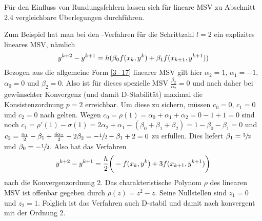 Für den Einfluss von Rundungsfehlern lassen sich für lineare MSV zu Abschnitt 2.4 vergleichbare Überlegungen durchführen.

Zum Beispiel hat man bei den -Verfahren für die Schrittzahl $l=2$ ein explizites lineares MSV, nämlich 
\begin{align}
	y^{k+2} - y^{k+1} = h(\beta_0 f(x_k,y^k) + \beta_1 f(x_{k+1},y^{k+1})) \notag
\end{align}
Bezogen aus die allgemeine Form \cref{3_17} linearer MSV gilt hier $\alpha_2=1$, $\alpha_1=-1$, $\alpha_0=0$ und $\beta_2=0$. Also ist für dieses spezielle MSV $\frac{\beta_2}{\alpha_2}=0$ und nach  daher bei gewünschter Konvergenz (und damit D-Stabilität) maximal die Konsistenzordnung $p=2$ erreichbar. Um diese zu sichern, müssen $c_0=0$, $c_1=0$ und $c_2=0$ nach  gelten. Wegen $c_0=\rho(1)=\alpha_0 + \alpha_1 + \alpha_2 = 0-1+1=0$ sind noch $c_1=\rho'(1)-\sigma(1)=2\alpha_2 + \alpha_1 - (\beta_0 + \beta_1 + \beta_2) = 1-\beta_0 - \beta_1 = 0$ und $c_2=\frac{\alpha_1}{2} - \beta_1 + \frac{4\alpha_2}{2} - 2\beta_2 = -\sfrac{1}{2} - \beta_1 + 2 = 0$ zu erfüllen. Dies liefert $\beta_1 = \sfrac{3}{2}$ und $\beta_0=-\sfrac{1}{2}$. Also hat das Verfahren
\begin{align}
	y^{k+2} - y^{k+1} = \frac{h}{2}\bigg(-f(x_k,y^k) + 3f(x_{k+1},y^{k+1})\bigg)\notag
\end{align}
nach  die Konvergenzordnung 2. Das charakteristische Polynom $\rho$ des linearen MSV ist offenbar gegeben durch $\rho(z)=z^2-z$. Seine Nullstellen sind $z_1=0$ und $z_2=1$. Folglich ist das Verfahren auch D-stabil und damit nach  konvergent mit der Ordnung 2.